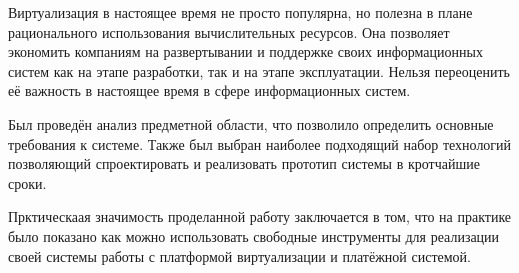 Виртуализация в настоящее время не просто популярна, но полезна в плане рационального использования вычислительных ресурсов. Она позволяет экономить компаниям на развертывании и поддержке своих информационных систем как на этапе разработки, так и на этапе эксплуатации. Нельзя переоценить её важность в настоящее время в сфере информационных систем.



Был проведён анализ предметной области, что позволило определить основные требования к системе. Также был выбран наиболее подходящий набор технологий позволяющий спроектировать и реализовать прототип системы в кротчайшие сроки. 



Прктическаая значимость проделанной работу заключается в том, что на практике было показано как можно использовать свободные инструменты для реализации своей системы работы с платформой виртуализации и платёжной системой.


